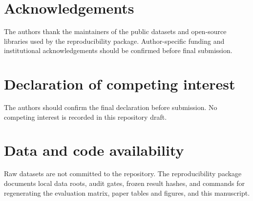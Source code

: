 \documentclass[preprint,review,12pt]{elsarticle}
\begin{document}
\section*{Acknowledgements}
The authors thank the maintainers of the public datasets and open-source
libraries used by the reproducibility package. Author-specific funding and
institutional acknowledgements should be confirmed before final submission.

\section*{Declaration of competing interest}
The authors should confirm the final declaration before submission. No competing
interest is recorded in this repository draft.

\section*{Data and code availability}
Raw datasets are not committed to the repository. The reproducibility package
documents local data roots, audit gates, frozen result hashes, and commands for
regenerating the evaluation matrix, paper tables and figures, and this manuscript.



\end{document}
